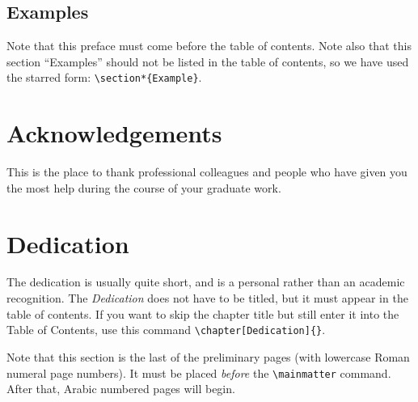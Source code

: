 \section*{Examples}




Note that this preface must come before the table of contents.  Note
also that this section ``Examples'' should not be listed in the table
of contents, so we have used the starred form: \verb|\section*{Example}|.

\tableofcontents                %
\listoftables                   %
\listoffigures                  %

\chapter{Acknowledgements}      %
This is the place to thank professional colleagues and people who have
given you the most help during the course of your graduate work.

\chapter{Dedication} %
The dedication is usually quite short, and is a personal rather than
an academic recognition.  The \emph{Dedication} does not have to be
titled, but it must appear in the table of contents.  If you want to
skip the chapter title but still enter it into the Table of Contents,
use this command \verb|\chapter[Dedication]{}|.

Note that this section is the last of the preliminary pages (with
lowercase Roman numeral page numbers).  It must be placed
\emph{before} the \verb|\mainmatter| command.  After that, Arabic
numbered pages will begin.


\mainmatter


